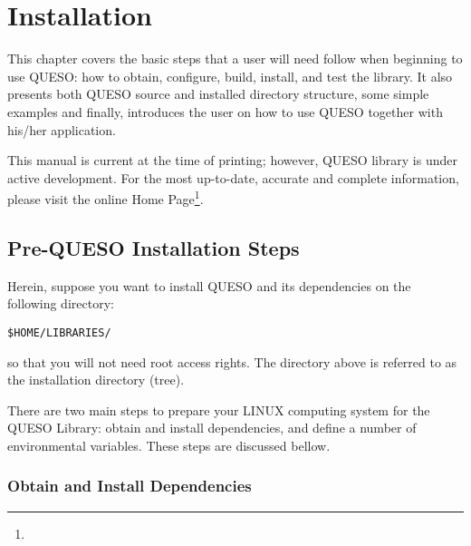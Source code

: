 \chapter{Installation}\label{ch-install}
\thispagestyle{headings}


  
This chapter covers the basic steps that a user will need follow when beginning to use QUESO: 
how to obtain, configure, build, install, and test the library.  It also presents both QUESO source and installed directory structure, some simple examples and finally,  introduces the user on how to use QUESO together with his/her application.

This manual is current at the time of
printing; however, QUESO library  is under active development. For the most up-to-date, accurate and complete information,
please visit the online \Queso{} Home Page\footnote{\Quesoweb}.



        
\section{Pre-QUESO Installation Steps}\label{sec:Pre_Queso}


Herein, suppose you want to install QUESO and its dependencies on the following directory:
\begin{lstlisting}
$HOME/LIBRARIES/
\end{lstlisting}
%
so that you will not need root access rights. The directory above is referred to as the \Queso{} installation directory (tree).

There are two main steps to prepare your LINUX computing system  for  the QUESO Library: obtain and install \Queso{} dependencies, and define a number of environmental variables. These steps are discussed bellow.


\subsection{Obtain and Install \Queso{} Dependencies}

